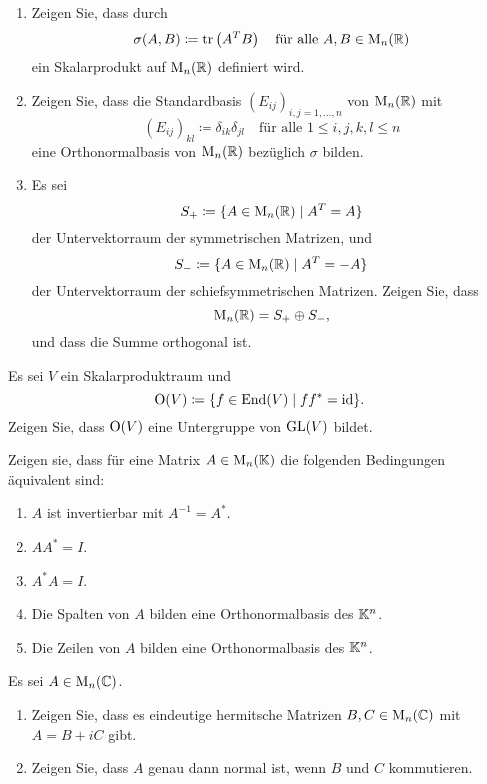 \documentclass[a4paper,10pt]{scrartcl}
\begin{document}
\begin{question}
  \begin{enumerate}[leftmargin=*]
    \item
      Zeigen Sie, dass durch
      \[
        \sigma(A, B) \coloneqq \operatorname{tr}\left( A^T B \right)
        \quad
        \text{für alle $A, B \in \operatorname{M}_n(\mathbb{R})$}
      \]
      ein Skalarprodukt auf $\operatorname{M}_n(\mathbb{R})$ definiert wird.
    \item
      Zeigen Sie, dass die Standardbasis $(E_{ij})_{i,j=1,\dotsc,n}$ von $\operatorname{M}_n(\mathbb{R})$ mit
      \[
        (E_{ij})_{kl} \coloneqq \delta_{ik} \delta_{jl}
        \quad
        \text{für alle $1 \leq i,j,k,l \leq n$}
      \]
      eine Orthonormalbasis von $\operatorname{M}_n(\mathbb{R})$ bezüglich $\sigma$ bilden.
    \item
      Es sei
      \[
        S_+ \coloneqq \{A \in \operatorname{M}_n(\mathbb{R}) \mid A^T = A\}
      \]
      der Untervektorraum der symmetrischen Matrizen, und
      \[
        S_- \coloneqq \{A \in \operatorname{M}_n(\mathbb{R}) \mid A^T  = -A\}
      \]
      der Untervektorraum der schiefsymmetrischen Matrizen.
      Zeigen Sie, dass
      \[
        \operatorname{M}_n(\mathbb{R}) = S_+ \oplus S_-,
      \]
      und dass die Summe orthogonal ist.
  \end{enumerate}
\end{question}


\begin{question}
  Es sei $V$ ein Skalarproduktraum und
  \[
    \operatorname{O}(V) \coloneqq \{ f \in \operatorname{End}(V) \mid f f^* = \operatorname{id} \}.
  \]
  Zeigen Sie, dass $\operatorname{O}(V)$ eine Untergruppe von $\operatorname{GL}(V)$ bildet.
\end{question}


\begin{question}
Zeigen sie, dass für eine Matrix $A \in \operatorname{M}_n(\mathbb{K})$ die folgenden Bedingungen äquivalent sind:
  \begin{enumerate}
    \item
      $A$ ist invertierbar mit $A^{-1} = A^*$.
    \item
      $A A^* = I$.
    \item
      $A^* A = I$.
    \item
      Die Spalten von $A$ bilden eine Orthonormalbasis des $\mathbb{K}^n$.
    \item
      Die Zeilen von $A$ bilden eine Orthonormalbasis des $\mathbb{K}^n$.
  \end{enumerate}
\end{question}


\begin{question}
  Es sei $A \in \operatorname{M}_n(\mathbb{C})$.
  \begin{enumerate}[leftmargin=*]
    \item
      Zeigen Sie, dass es eindeutige hermitsche Matrizen $B, C \in \operatorname{M}_n(\mathbb{C})$ mit $A = B + i C$ gibt.
    \item
      Zeigen Sie, dass $A$ genau dann normal ist, wenn $B$ und $C$ kommutieren.
  \end{enumerate}
\end{question}
\end{document}
